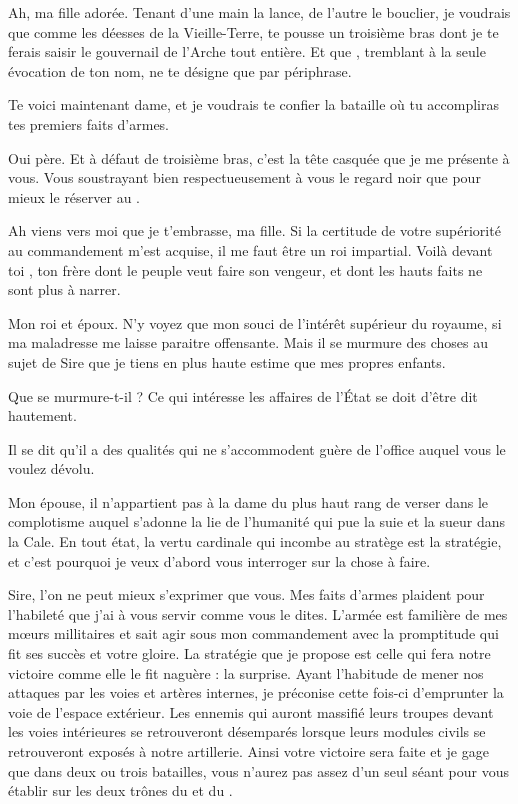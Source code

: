 \begin{drama}
  \roispeaks Ah, ma fille adorée. Tenant d’une main la lance, de l’autre le bouclier, je voudrais que comme les déesses de la Vieille-Terre, te pousse un troisième bras dont je te ferais saisir le gouvernail de l’Arche tout entière. Et que \campoppose{}, tremblant à la seule évocation de ton nom, ne te désigne que par périphrase.

  Te voici maintenant dame, et je voudrais te confier la bataille où tu accompliras tes premiers faits d’armes.


  \princessespeaks Oui père. Et à défaut de troisième bras, c’est la tête casquée que je me présente à vous. Vous soustrayant bien respectueusement à vous le regard noir que pour mieux le réserver au \campoppose{}.

  \roispeaks Ah viens vers moi que je t’embrasse, ma fille. Si la certitude de votre supériorité au commandement m’est acquise, il me faut être un roi impartial. Voilà devant toi \elena{}, ton frère dont le peuple veut faire son vengeur, et \general{} dont les hauts faits ne sont plus à narrer.

  \reinespeaks Mon roi et époux. N’y voyez que mon souci de l’intérêt supérieur du royaume, si ma maladresse me laisse paraitre offensante. Mais il se murmure des choses au sujet de Sire \elena{} que je tiens en plus haute estime que mes propres enfants.

  \roispeaks Que se murmure-t-il ?  Ce qui intéresse les affaires de l’État se doit d’être dit hautement.

  \reinespeaks Il se dit qu’il a des qualités qui ne s’accommodent guère de l’office auquel vous le voulez dévolu.

  \roispeaks Mon épouse, il n’appartient pas à la dame du plus haut rang de verser dans le complotisme auquel s’adonne la lie de l’humanité qui pue la suie et la sueur dans la Cale.
  En tout état, la vertu cardinale qui incombe au stratège est la stratégie,  et c’est pourquoi je veux d’abord vous interroger \general{} sur la chose à faire.

  \generalspeaks Sire, l’on ne peut mieux s’exprimer que vous. Mes faits d’armes plaident pour l’habileté que j’ai à vous servir comme vous le dites. L’armée est familière de mes mœurs millitaires et sait agir sous mon commandement avec la promptitude qui fit ses succès et votre gloire. La stratégie que je propose est celle qui fera notre victoire comme elle le fit naguère : la surprise. Ayant l’habitude de mener nos attaques par les voies et artères internes, je préconise cette fois-ci d’emprunter la voie de l’espace extérieur. Les ennemis qui auront massifié leurs troupes devant les voies intérieures se retrouveront désemparés lorsque leurs modules civils se retrouveront exposés à notre artillerie. Ainsi votre victoire sera faite et je gage que dans deux ou trois batailles, vous n’aurez pas assez d’un seul séant pour vous établir sur les deux trônes du \campprincipal{} et du \campoppose{}.


\end{drama}

